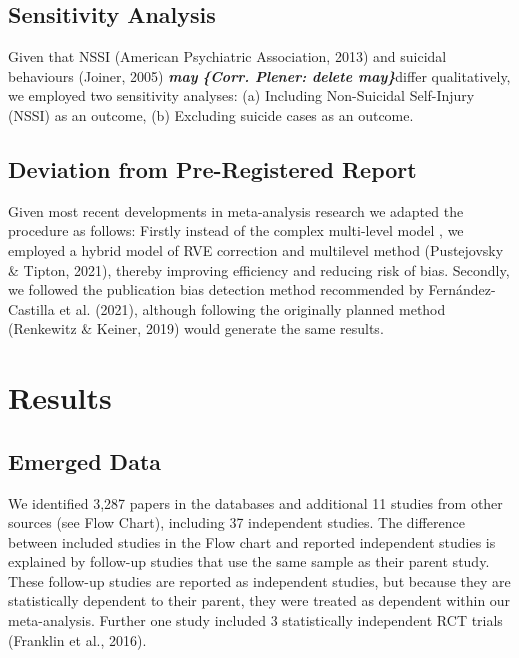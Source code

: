 \documentclass[
  english,
  man]{apa6}
\begin{document}
\hypertarget{sensitivity-analysis}{%
\subsection{Sensitivity Analysis}\label{sensitivity-analysis}}

Given that NSSI (American Psychiatric Association, 2013) and suicidal behaviours (Joiner, 2005) \textbf{\emph{may}} \textbf{\emph{\{Corr. Plener: delete may\}}}differ qualitatively, we employed two sensitivity analyses: (a) Including Non-Suicidal Self-Injury (NSSI) as an outcome, (b) Excluding suicide cases as an outcome.

\hypertarget{deviation-from-pre-registered-report}{%
\subsection{Deviation from Pre-Registered Report}\label{deviation-from-pre-registered-report}}

Given most recent developments in meta-analysis research we adapted the procedure as follows: Firstly instead of the complex multi-level model , we employed a hybrid model of RVE correction and multilevel method (Pustejovsky \& Tipton, 2021), thereby improving efficiency and reducing risk of bias. Secondly, we followed the publication bias detection method recommended by Fernández-Castilla et al. (2021), although following the originally planned method (Renkewitz \& Keiner, 2019) would generate the same results.

\hypertarget{results}{%
\section{Results}\label{results}}

\hypertarget{emerged-data}{%
\subsection{Emerged Data}\label{emerged-data}}

We identified 3,287 papers in the databases and additional 11 studies from other sources (see Flow Chart), including 37 independent studies. The difference between included studies in the Flow chart and reported independent studies is explained by follow-up studies that use the same sample as their parent study. These follow-up studies are reported as independent studies, but because they are statistically dependent to their parent, they were treated as dependent within our meta-analysis. Further one study included 3 statistically independent RCT trials (Franklin et al., 2016).
\end{document}
